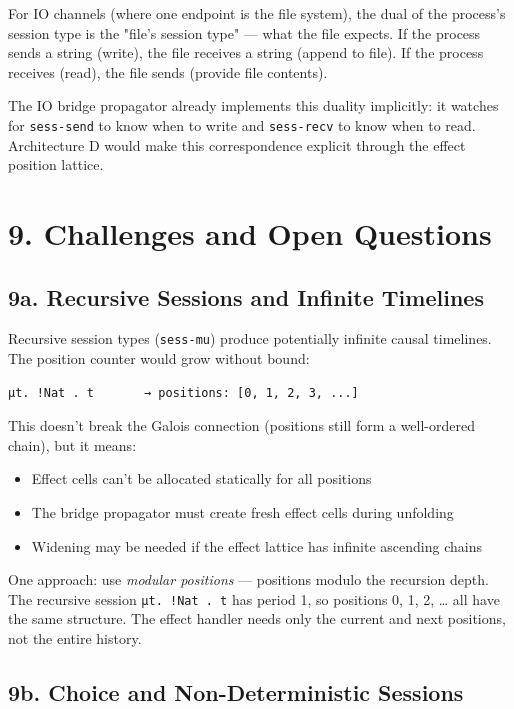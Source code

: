 \documentclass[11pt]{article}
\begin{document}
For IO channels (where one endpoint is the file system), the dual of the
process's session type is the "file's session type" — what the file expects.
If the process sends a string (write), the file receives a string (append to
file). If the process receives (read), the file sends (provide file contents).

The IO bridge propagator already implements this duality implicitly: it watches
for \texttt{sess-send} to know when to write and \texttt{sess-recv} to know when to read.
Architecture D would make this correspondence explicit through the effect
position lattice.
\section{9. Challenges and Open Questions}
\label{sec:orgf555c9b}

\subsection{9a. Recursive Sessions and Infinite Timelines}
\label{sec:org9b13083}

Recursive session types (\texttt{sess-mu}) produce potentially infinite causal
timelines. The position counter would grow without bound:

\begin{verbatim}
μt. !Nat . t       → positions: [0, 1, 2, 3, ...]
\end{verbatim}

This doesn't break the Galois connection (positions still form a well-ordered
chain), but it means:
\begin{itemize}
\item Effect cells can't be allocated statically for all positions
\item The bridge propagator must create fresh effect cells during unfolding
\item Widening may be needed if the effect lattice has infinite ascending chains
\end{itemize}

One approach: use \emph{modular positions} — positions modulo the recursion depth.
The recursive session \texttt{μt. !Nat . t} has period 1, so positions 0, 1, 2, \ldots{}
all have the same structure. The effect handler needs only the current and next
positions, not the entire history.
\subsection{9b. Choice and Non-Deterministic Sessions}
\label{sec:orge28d715}
\end{document}
